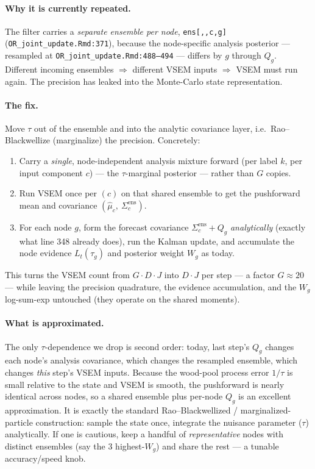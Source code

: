 \documentclass[11pt]{article}
\newcommand{\code}[1]{\texttt{#1}}
\begin{document}
\paragraph{Why it is currently repeated.} The filter carries a \emph{separate
ensemble per node}, \code{ens[,,c,g]} (\code{OR\_joint\_update.Rmd:371}), because the
node-specific analysis posterior --- resampled at
\code{OR\_joint\_update.Rmd:488--494} --- differs by $g$ through $Q_g$. Different
incoming ensembles $\Rightarrow$ different VSEM inputs $\Rightarrow$ VSEM must run
again. The precision has leaked into the Monte-Carlo state representation.

\paragraph{The fix.} Move $\tau$ out of the ensemble and into the analytic covariance
layer, i.e.\ Rao--Blackwellize (marginalize) the precision. Concretely:
\begin{enumerate}[nosep]
  \item Carry a \emph{single}, node-independent analysis mixture forward (per label
        $k$, per input component $c$) --- the $\tau$-marginal posterior --- rather
        than $G$ copies.
  \item Run VSEM once per $(c)$ on that shared ensemble to get the pushforward mean
        and covariance $(\hat\mu_c,\ \Sigma^{\text{ens}}_c)$.
  \item For each node $g$, form the forecast covariance
        $\Sigma^{\text{ens}}_c + Q_g$ \emph{analytically} (exactly what line 348 already
        does), run the Kalman update, and accumulate the node evidence $L_t(\tau_g)$
        and posterior weight $W_g$ as today.
\end{enumerate}
This turns the VSEM count from $G\cdot D\cdot J$ into $D\cdot J$ per step --- a factor
$G\approx 20$ --- while leaving the precision quadrature, the evidence accumulation,
and the $W_g$ log-sum-exp untouched (they operate on the shared moments).

\paragraph{What is approximated.} The only $\tau$-dependence we drop is second order:
today, last step's $Q_g$ changes each node's analysis covariance, which changes the
resampled ensemble, which changes \emph{this} step's VSEM inputs. Because the wood-pool
process error $1/\tau$ is small relative to the state and VSEM is smooth, the
pushforward is nearly identical across nodes, so a shared ensemble plus per-node $Q_g$
is an excellent approximation. It is exactly the standard Rao--Blackwellized /
marginalized-particle construction: sample the state once, integrate the nuisance
parameter ($\tau$) analytically. If one is cautious, keep a handful of
\emph{representative} nodes with distinct ensembles (say the 3 highest-$W_g$) and share
the rest --- a tunable accuracy/speed knob.
\end{document}
